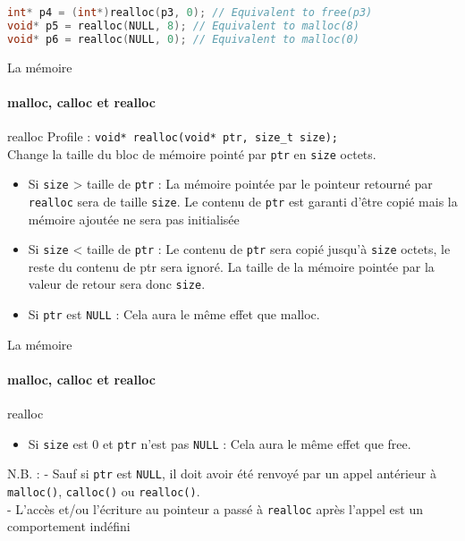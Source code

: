 \documentclass{beamer}
\begin{document}
\begin{darkframes}
{\begin{lstlisting}[language=C,tabsize=2]
int* p4 = (int*)realloc(p3, 0); // Equivalent to free(p3)
void* p5 = realloc(NULL, 8); // Equivalent to malloc(8)
void* p6 = realloc(NULL, 0); // Equivalent to malloc(0)
\end{lstlisting}}
	\begin{frame}{La mémoire}
		\framesubtitle{malloc, calloc et realloc}
		\begin{block}{realloc}
			\alert{Profile} : \texttt{void* realloc(void* ptr, size\_t size);} \\
			Change la taille du bloc de mémoire pointé par \texttt{ptr} en \texttt{size} octets. 
			\begin{itemize}
				\item Si \texttt{size} > taille de \texttt{ptr} : La mémoire pointée par le pointeur retourné par \texttt{realloc} sera de taille \texttt{size}. Le contenu de \texttt{ptr} est garanti d'être copié mais la mémoire ajoutée ne sera \alert{pas initialisée}
				\item Si \texttt{size} < taille de \texttt{ptr} : Le contenu de \texttt{ptr} sera copié jusqu'à \texttt{size} octets, le reste du contenu de ptr sera ignoré. La taille de la mémoire pointée par la valeur de retour sera donc \texttt{size}.
				\item Si \texttt{ptr} est \texttt{NULL} : Cela aura le même effet que malloc.
			\end{itemize}
		\end{block}
	\end{frame}

	\begin{frame}{La mémoire}
		\framesubtitle{malloc, calloc et realloc}
		\begin{block}{realloc}
			\begin{itemize}
				\item Si \texttt{size} est $0$ et \texttt{ptr} n'est pas \texttt{NULL} :  Cela aura le même effet que free.
			\end{itemize}
		\end{block}
		\begin{alertblock}{N.B. :}
			- Sauf si \texttt{ptr} est \texttt{NULL}, il doit avoir été renvoyé par un appel antérieur
			à \texttt{malloc()}, \texttt{calloc()} ou \texttt{realloc()}. \\
			- L'accès et/ou l'écriture au pointeur a passé à \texttt{realloc} après l'appel est un \alert{comportement indéfini}\\
		\end{alertblock}
	\end{frame}


\end{darkframes}
\end{document}
